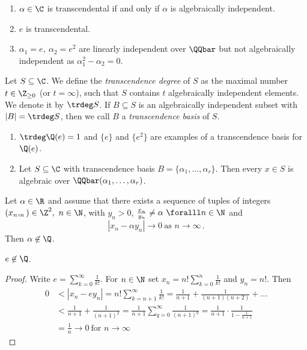 \begin{exmp*}
	\begin{enumerate}
		\item \( \alpha \in \C \) is transcendental if and only if \( \alpha \) is algebraically independent.
		\item \( e \) is transcendental.
		\item \( \alpha_1 = e,\ \alpha_2 = e^2 \) are linearly independent over \( \QQbar \) but not algebraically independent as \( \alpha_1^2 - \alpha_2 = 0 \).
	\end{enumerate}
\end{exmp*}

\begin{defn*}
	Let \( S \subseteq \C \).
	We define the \emph{transcendence degree} of \( S \) as the maximal number \( t \in \Z_{\geq 0} \) (or \( t = \infty \)), such that \( S \) contains \( t \) algebraically independent elements.
	We denote it by \( \trdeg S \).
	If \( B \subseteq S \) is an algebraically independent subset with \( |B| = \trdeg S \), then we call \( B \) a \emph{transcendence basis} of \( S \).
\end{defn*}

\begin{exmp*}
	\begin{enumerate}
		\item \( \trdeg \Q(e) = 1 \) and \( \{e\} \) and \( \{e^2\} \) are examples of a transcendence basis for \( \Q(e) \).
		\item Let \( S \subseteq \C \) with transcendence basis \( B = \{\alpha_1, \dotsc, \alpha_r\} \).
			Then every \( x \in S \) is algebraic over \( \QQbar(\alpha_1, \dots, \alpha_r) \).
	\end{enumerate}
\end{exmp*}

\begin{lem}
	Let \( \alpha \in \R \) and assume that there exists a sequence of tuples of integers \( (x_n, _n) \in \Z^2,\ n \in \N \), with \( y_n>0 \), \( \frac{x_n}{y_n} \neq \alpha \ \foralll n \in \N \) and
	\[ |x_n - \alpha y_n| \to 0\ \text{as } n \to \infty \,. \]
	Then \( \alpha \not\in \Q \).
\end{lem}

\begin{thmn}
	\( e \not\in \Q \).
\end{thmn}

\begin{proof}
	Write \( e = \sum_{k=0}^{\infty} \frac{1}{k!} \).
	For \( n \in \N \) set \( x_n = n! \sum_{k=0}^{n} \frac{1}{k!} \) and \( y_n = n! \).
	Then
	\begin{align*}
		0 &< \left| x_n - e y_n \right| = n! \sum_{k=n+1}^{\infty} \frac{1}{k!} = \frac{1}{n+1} + \frac{1}{(n+1)(n+2)} + \dots\\
		&< \frac{1}{n+1} + \frac{1}{(n+1)^2} = \frac{1}{n+1} \sum_{q=0}^{\infty} \frac{1}{(n+1)^q} = \frac{1}{n+1} \cdot \frac{1}{1 - \frac{1}{n+1}}\\
		&= \frac{1}{n} \to 0 \ \text{for } n \to \infty
	\end{align*}
\end{proof}

